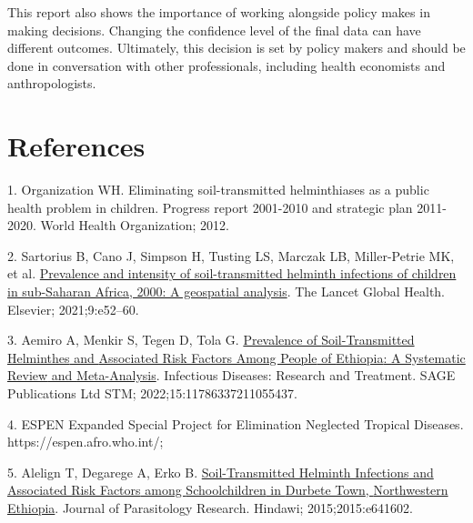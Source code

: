 \documentclass[
]{article}
\newlength{\cslhangindent}
\newlength{\cslentryspacingunit} %
\newenvironment{CSLReferences}[2] %
 {%
  \setlength{\parindent}{0pt}
  \ifodd #1
  \let\oldpar\par
  \def\par{\hangindent=\cslhangindent\oldpar}
  \fi
  \setlength{\parskip}{#2\cslentryspacingunit}
 }%
 {}
\begin{document}
This report also shows the importance of working alongside policy makes
in making decisions. Changing the confidence level of the final data can
have different outcomes. Ultimately, this decision is set by policy
makers and should be done in conversation with other professionals,
including health economists and anthropologists.

\hypertarget{references}{%
\section*{References}\label{references}}

\hypertarget{refs}{}
\begin{CSLReferences}{0}{0}
\leavevmode{}%
1. Organization WH. Eliminating soil-transmitted helminthiases as a
public health problem in children. {Progress} report 2001-2010 and
strategic plan 2011-2020. {World Health Organization}; 2012.

\leavevmode{}%
2. Sartorius B, Cano J, Simpson H, Tusting LS, Marczak LB, Miller-Petrie
MK, et al.
\href{https://doi.org/10.1016/S2214-109X(20)30398-3}{Prevalence and
intensity of soil-transmitted helminth infections of children in
sub-{Saharan Africa}, 2000: A geospatial analysis}. The
Lancet Global Health. {Elsevier}; 2021;9:e52--60.

\leavevmode{}%
3. Aemiro A, Menkir S, Tegen D, Tola G.
\href{https://doi.org/10.1177/11786337211055437}{Prevalence of
{Soil-Transmitted Helminthes} and {Associated Risk Factors Among People}
of {Ethiopia}: {A Systematic Review} and {Meta-Analysis}}. Infectious
Diseases: Research and Treatment. {SAGE Publications Ltd STM};
2022;15:11786337211055437.

\leavevmode{}%
4. {ESPEN} \textbar{} {Expanded Special Project} for {Elimination
Neglected Tropical Diseases}. https://espen.afro.who.int/;

\leavevmode{}%
5. Alelign T, Degarege A, Erko B.
\href{https://doi.org/10.1155/2015/641602}{Soil-{Transmitted Helminth
Infections} and {Associated Risk Factors} among {Schoolchildren} in
{Durbete Town}, {Northwestern Ethiopia}}. Journal of Parasitology
Research. {Hindawi}; 2015;2015:e641602.


\end{CSLReferences}
\end{document}
